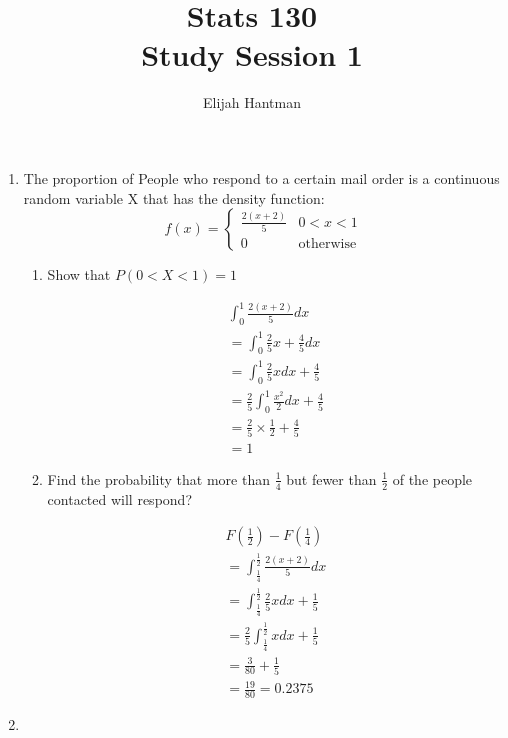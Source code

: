 \documentclass{report}
\title{\Huge{Stats 130}\\Study Session 1}
\author{\huge{Elijah Hantman}}
\date{}
\begin{document}
\maketitle
\newpage

\begin{enumerate}
    \item The proportion of People who respond
        to a certain mail order is a continuous
        random variable X that has the density function:
        \begin{displaymath}
            f(x) = 
            \begin{cases}
                \frac{2(x+2)}{5} & 0 < x < 1\\ 
                0 & \textrm{otherwise}
            \end{cases}
        \end{displaymath}

        \begin{enumerate}
            \item Show that $P(0 < X < 1) = 1$
                 \begin{mdframed}
                    \begin{gather}
                       \int_0^1 \frac{2(x+2)}{5}dx\\
                   = \int_0^1 \frac{2}{5} x + \frac{4}{5} dx\\
                   = \int_0^1 \frac{2}{5} x dx + \frac{4}{5}\\
                   = \frac{2}{5} \int_0^1 \frac{x^2}{2} dx + \frac{4}{5}\\
                   = \frac{2}{5} \times \frac{1}{2} + \frac{4}{5}\\
                   = 1
                    \end{gather}
                \end{mdframed}
            \item Find the probability that more than $\frac{1}{4}$
                but fewer than  $\frac{1}{2}$ of the people
                contacted will respond?
                 \begin{mdframed}
                    \begin{gather}
                        F(\frac{1}{2}) - F(\frac{1}{4})\\  
                        = \int_{\frac{1}{4}}^{\frac{1}{2}} \frac{2(x+2)}{5} dx\\
                        = \int_{\frac{1}{4}}^{\frac{1}{2}} \frac{2}{5} x dx + \frac{1}{5}\\
                        = \frac{2}{5}\int_{\frac{1}{4}}^{\frac{1}{2}} x dx + \frac{1}{5}\\ 
                        = \frac{3}{80} + \frac{1}{5}\\
                        = \frac{19}{80} = 0.2375
                    \end{gather}
                \end{mdframed}
        \end{enumerate}

    \item 
        

\end{enumerate}
\end{document}
